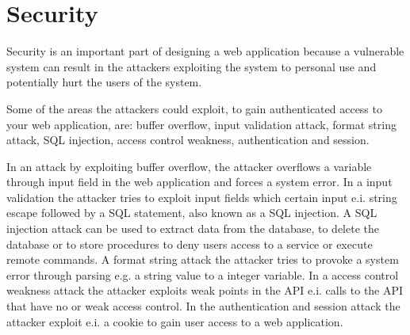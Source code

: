 \section{Security}
Security is an important part of designing a web application because a vulnerable system can result in the attackers exploiting the system to personal use and potentially hurt the users of the system.

Some of the areas the attackers could exploit, to gain authenticated access to your web application, are: buffer overflow, input validation attack, format string attack, SQL injection, access control weakness, authentication and session.

In an attack by exploiting buffer overflow, the attacker overflows a variable through input field in the web application and forces a system error. In a input validation the attacker tries to exploit input fields which certain input e.i. string escape followed by a SQL statement, also known as a SQL injection. A SQL injection attack can be used to extract data from the database, to delete the database or to store procedures to deny users access to a service or execute remote commands. A format string attack the attacker tries to provoke a system error through parsing e.g. a string value to a integer variable. In a access control weakness attack the attacker exploits weak points in the API e.i. calls to the API that have no or weak access control. In the authentication and session attack the attacker exploit e.i. a cookie to gain user access to a web application.